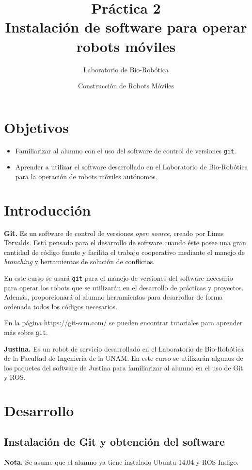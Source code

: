 \documentclass[a4paper,12pt]{article}
\title{Práctica 2 \\ Instalación de software para operar robots móviles}
\author{Laboratorio de Bio-Robótica}
\date{Construcción de Robots Móviles}
\begin{document}
\renewcommand{\tablename}{Tabla}
\maketitle
\section*{Objetivos}
\begin{itemize}
\item Familiarizar al alumno con el uso del software de control de versiones \texttt{git}.
\item Aprender a utilizar el software desarrollado en el Laboratorio de Bio-Robótica para la operación de robots móviles autónomos. 
\end{itemize}

\section{Introducción}
\textbf{Git.} Es un software de control de versiones \textit{open source}, creado por Linus Torvalds. Está pensado para el desarrollo de software cuando éste posee una gran cantidad de código fuente y facilita el trabajo cooperativo mediante el manejo de \textit{branching} y herramientas de solución de conflictos. 

En este curso se usará \texttt{git} para el manejo de versiones del software necesario para operar los robots que se utilizarán en el desarrollo de prácticas y proyectos. Además, proporcionará al alumno herramientas para desarrollar de forma ordenada todos los códigos necesarios.

En la página \url{https://git-scm.com/} se pueden encontrar tutoriales para aprender más sobre \texttt{git}.

\textbf{Justina.} Es un robot de servicio desarrollado en el Laboratorio de Bio-Robótica de la Facultad de Ingeniería de la UNAM. En este curso se utilizarán algunos de los paquetes del software de Justina para familiarizar al alumno en el uso de Git y ROS. 

\section{Desarrollo}
\subsection{Instalación de Git y obtención del software}
\textbf{Nota.} Se asume que el alumno ya tiene instalado Ubuntu 14.04 y ROS Indigo. 
\end{document}
